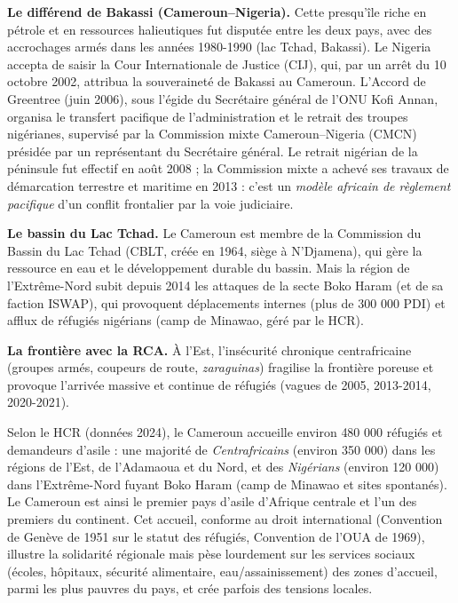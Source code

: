 \documentclass[11pt]{article}
\newcommand{\cle}[1]{{\popxbold\color{popdark}#1}}
\begin{document}
\textbf{Le différend de Bakassi (Cameroun--Nigeria).} Cette presqu'île riche en pétrole et en ressources halieutiques fut disputée entre les deux pays, avec des accrochages armés dans les années 1980-1990 (lac Tchad, Bakassi). Le Nigeria accepta de saisir la \cle{Cour Internationale de Justice} (CIJ), qui, par un arrêt du \cle{10 octobre 2002}, attribua la souveraineté de Bakassi au Cameroun. L'\cle{Accord de Greentree} (juin 2006), sous l'égide du Secrétaire général de l'ONU Kofi Annan, organisa le transfert pacifique de l'administration et le retrait des troupes nigérianes, supervisé par la \cle{Commission mixte Cameroun--Nigeria} (CMCN) présidée par un représentant du Secrétaire général. Le retrait nigérian de la péninsule fut effectif en \cle{août 2008} ; la Commission mixte a achevé ses travaux de démarcation terrestre et maritime en \cle{2013} : c'est un \emph{modèle africain de règlement pacifique} d'un conflit frontalier par la voie judiciaire.

\textbf{Le bassin du Lac Tchad.} Le Cameroun est membre de la \cle{Commission du Bassin du Lac Tchad} (CBLT, créée en 1964, siège à N'Djamena), qui gère la ressource en eau et le développement durable du bassin. Mais la région de l'Extrême-Nord subit depuis \cle{2014} les attaques de la secte \cle{Boko Haram} (et de sa faction ISWAP), qui provoquent déplacements internes (plus de 300 000 PDI) et afflux de réfugiés nigérians (camp de Minawao, géré par le HCR).

\textbf{La frontière avec la RCA.} À l'Est, l'insécurité chronique centrafricaine (groupes armés, coupeurs de route, \emph{zaraguinas}) fragilise la frontière poreuse et provoque l'arrivée massive et continue de réfugiés (vagues de 2005, 2013-2014, 2020-2021).

\begin{exemplebox}
Selon le HCR (données 2024), le Cameroun accueille environ \cle{480 000 réfugiés et demandeurs d'asile} : une majorité de \emph{Centrafricains} (environ 350 000) dans les régions de l'Est, de l'Adamaoua et du Nord, et des \emph{Nigérians} (environ 120 000) dans l'Extrême-Nord fuyant Boko Haram (camp de Minawao et sites spontanés). Le Cameroun est ainsi le \cle{premier pays d'asile} d'Afrique centrale et l'un des premiers du continent. Cet accueil, conforme au droit international (Convention de Genève de 1951 sur le statut des réfugiés, Convention de l'OUA de 1969), illustre la solidarité régionale mais pèse lourdement sur les services sociaux (écoles, hôpitaux, sécurité alimentaire, eau/assainissement) des zones d'accueil, parmi les plus pauvres du pays, et crée parfois des tensions locales.
\end{exemplebox}
\end{document}
